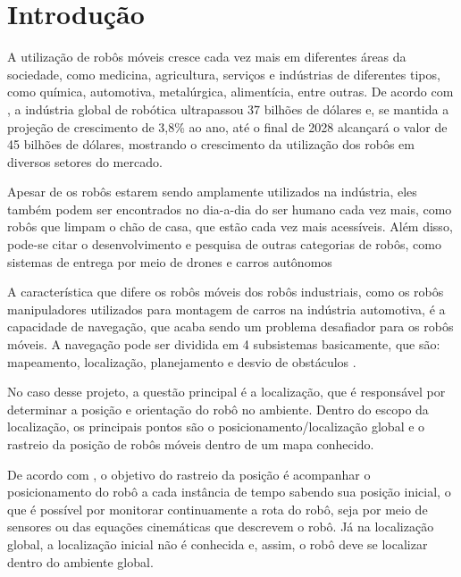 \documentclass[acronym, symbols, table, deposito]{fei}
\begin{document}
\begin{abstract}
	
	
	
\end{abstract}

\listoffigures
\listoftables
\listofalgorithms
\printglossary[type=\acronymtype]
\tableofcontents
\setcounter{table}{0}

\chapter{Introdução}

	A utilização de robôs móveis cresce cada vez mais em diferentes áreas da sociedade, como medicina, agricultura, serviços e indústrias de diferentes tipos, como química, automotiva, metalúrgica, alimentícia, entre outras. De acordo com \textcite{robotics_market}, a indústria global de robótica ultrapassou 37 bilhões de dólares e, se mantida a projeção de crescimento de 3,8\% ao ano, até o final de 2028 alcançará o valor de 45 bilhões de dólares, mostrando o crescimento da utilização dos robôs em diversos setores do mercado.
	
	Apesar de os robôs estarem sendo amplamente utilizados na indústria, eles também podem ser encontrados no dia-a-dia do ser humano cada vez mais, como robôs que limpam o chão de casa, que estão cada vez mais acessíveis. Além disso, pode-se citar o desenvolvimento e pesquisa de outras categorias de robôs, como sistemas de entrega por meio de drones \cite{su14010360} e carros autônomos \cite{parekh2022review}
	
	A característica que difere os robôs móveis dos robôs industriais, como os robôs manipuladores utilizados para montagem de carros na indústria automotiva, é a capacidade de navegação, que acaba sendo um problema desafiador para os robôs móveis. A navegação pode ser dividida em 4 subsistemas basicamente, que são: mapeamento, localização, planejamento e desvio de obstáculos \cite{app12146951}. 
	
	No caso desse projeto, a questão principal é a localização, que é responsável por determinar a posição e orientação do robô no ambiente. Dentro do escopo da localização, os principais pontos são o posicionamento/localização global e o rastreio da posição de robôs móveis dentro de um mapa conhecido.
	
	De acordo com \textcite{PANIGRAHI20226019}, o objetivo do rastreio da posição é acompanhar o posicionamento do robô a cada instância de tempo sabendo sua posição inicial, o que é possível por monitorar continuamente a rota do robô, seja por meio de sensores ou das equações cinemáticas que descrevem o robô. Já na localização global, a localização inicial não é conhecida e, assim, o robô deve se localizar dentro do ambiente global.
	
\end{document}

